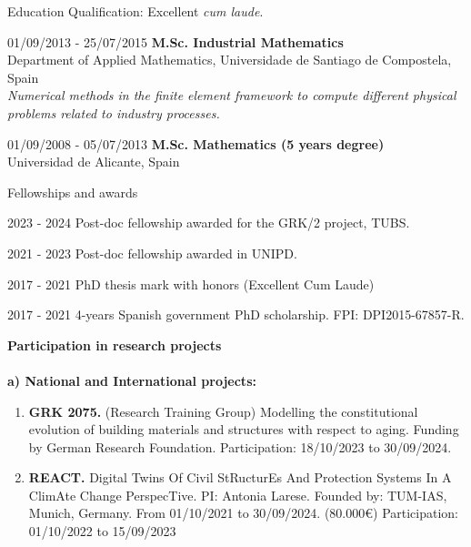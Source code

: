 \documentclass[letterpaper,english]{article}
\begin{document}
\begin{cv}{}
\begin{cvlist}{Education}
    Qualification: Excellent \textit{cum laude}.
	\item[\footnotesize{01/09/2013 - 25/07/2015}] \textbf{M.Sc. Industrial Mathematics}\\
	Department of Applied Mathematics, Universidade de Santiago de Compostela, Spain\\
	\textit{Numerical methods in the finite element framework to compute different physical problems related to industry processes.  }
	\item[\footnotesize{01/09/2008 - 05/07/2013}] \textbf{M.Sc. Mathematics (5 years degree)}\\
	Universidad de Alicante, Spain
\end{cvlist}
\setlength{\cvlabelwidth}{35mm} 
\begin{cvlist}{Fellowships and awards}
    \item[\footnotesize{2023 - 2024}] Post-doc fellowship awarded for the GRK/2 project, TUBS. 
    \item[\footnotesize{2021 - 2023}] Post-doc fellowship awarded in UNIPD. 
	\item[\footnotesize{2017 - 2021}] PhD thesis mark with honors (Excellent Cum Laude)
	\item[\footnotesize{2017 - 2021}]  4-years Spanish government PhD scholarship. FPI: DPI2015-67857-R.  
\end{cvlist}
\vspace{0.25cm}
\large{\textbf{Participation in research projects}}\\ \\
\normalsize
\textbf{a) National and International projects:}
\begin{enumerate}
\item \textbf{GRK 2075.} (Research Training Group) Modelling the constitutional evolution of building materials and structures with respect to aging. Funding by German Research Foundation. Participation: 18/10/2023 to 30/09/2024.  
    \item \textbf{REACT.} Digital Twins Of Civil StRucturEs And Protection Systems In A ClimAte Change PerspecTive. PI: Antonia Larese. Founded by: TUM-IAS, Munich, Germany. From 01/10/2021 to 30/09/2024. (80.000€) Participation: 01/10/2022 to 15/09/2023 

\end{enumerate}
\end{cv}
\end{document}

